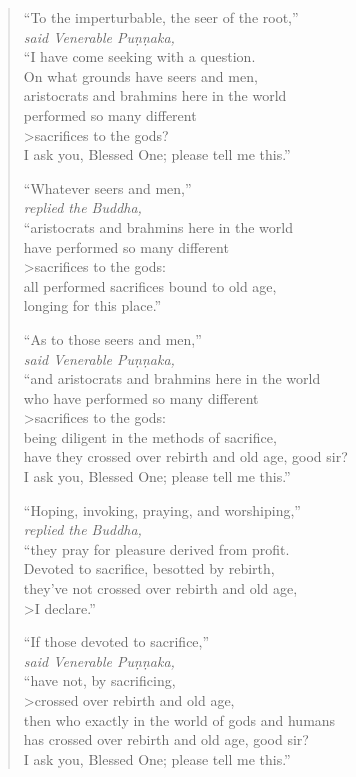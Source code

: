 \documentclass[12pt,openany]{book}%
\newcommand*{\scspeaker}[1]{\hspace{2em}\textit{#1}}
\begin{document}
\begin{verse}%
“To the imperturbable, the seer of the root,” \\
\scspeaker{said Venerable \textsanskrit{Puṇṇaka}, }\\
“I have come seeking with a question. \\
On what grounds have seers and men, \\
aristocrats and brahmins here in the world \\
performed so many different \\>sacrifices to the gods? \\
I ask you, Blessed One; please tell me this.” 

“Whatever seers and men,” \\
\scspeaker{replied the Buddha, }\\
“aristocrats and brahmins here in the world \\
have performed so many different \\>sacrifices to the gods: \\
all performed sacrifices bound to old age, \\
longing for this place.” 

“As to those seers and men,” \\
\scspeaker{said Venerable \textsanskrit{Puṇṇaka}, }\\
“and aristocrats and brahmins here in the world \\
who have performed so many different \\>sacrifices to the gods: \\
being diligent in the methods of sacrifice, \\
have they crossed over rebirth and old age, good sir? \\
I ask you, Blessed One; please tell me this.” 

“Hoping, invoking, praying, and worshiping,” \\
\scspeaker{replied the Buddha, }\\
“they pray for pleasure derived from profit. \\
Devoted to sacrifice, besotted by rebirth, \\
they’ve not crossed over rebirth and old age, \\>I declare.” 

“If those devoted to sacrifice,” \\
\scspeaker{said Venerable \textsanskrit{Puṇṇaka}, }\\
“have not, by sacrificing, \\>crossed over rebirth and old age, \\
then who exactly in the world of gods and humans \\
has crossed over rebirth and old age, good sir? \\
I ask you, Blessed One; please tell me this.” 


\end{verse}
\end{document}
